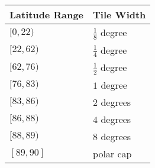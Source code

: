 \documentclass[12pt]{article}
\begin{document}
\pagestyle{empty}
{\newpage
\clearpage
\samepage \begin{figure}[hbt]
 \begin{center}
  \begin{tabular}{||l|l||} \hline
    Latitude Range & Tile Width \\  \hline
    $[0, 22)$  & $\frac{1}{8}$ degree \\  \hline
    $[22, 62)$ & $\frac{1}{4}$ degree \\  \hline
    $[62, 76)$ & $\frac{1}{2}$ degree \\  \hline
    $[76, 83)$ & $1$ degree \\  \hline
    $[83, 86)$ & $2$ degrees \\  \hline
    $[86, 88)$ & $4$ degrees \\  \hline
    $[88, 89)$ & $8$ degrees \\  \hline
    $[89, 90]$ & polar cap \\  \hline
   \hline
  \end{tabular}
 \end{center}

 
 \label{fig:lats}
\end{figure}
}

\end{document}
